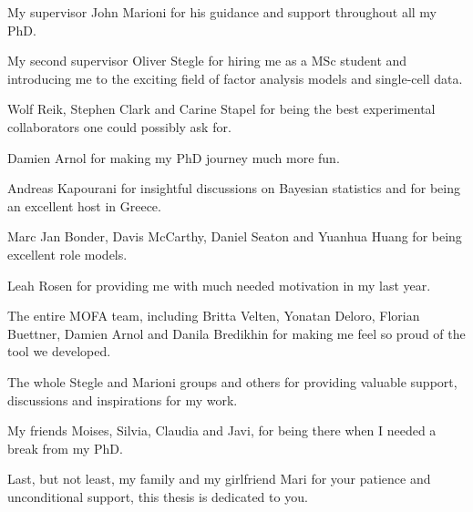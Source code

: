 
\begin{acknowledgements}

My supervisor John Marioni for his guidance and support throughout all my PhD.

My second supervisor Oliver Stegle for hiring me as a MSc student and introducing me to the exciting field of factor analysis models and single-cell data. 

Wolf Reik, Stephen Clark and Carine Stapel for being the best experimental collaborators one could possibly ask for. 

Damien Arnol for making my PhD journey much more fun.

Andreas Kapourani for insightful discussions on Bayesian statistics and for being an excellent host in Greece. 

Marc Jan Bonder, Davis McCarthy, Daniel Seaton and Yuanhua Huang for being excellent role models.

Leah Rosen for providing me with much needed motivation in my last year.

The entire MOFA team, including Britta Velten, Yonatan Deloro, Florian Buettner, Damien Arnol and Danila Bredikhin for making me feel so proud of the tool we developed.

The whole Stegle and Marioni groups and others for providing valuable support, discussions and inspirations for my work. 

My friends Moises, Silvia, Claudia and Javi, for being there when I needed a break from my PhD.

Last, but not least, my family and my girlfriend Mari for your patience and unconditional support, this thesis is dedicated to you.

\end{acknowledgements}
